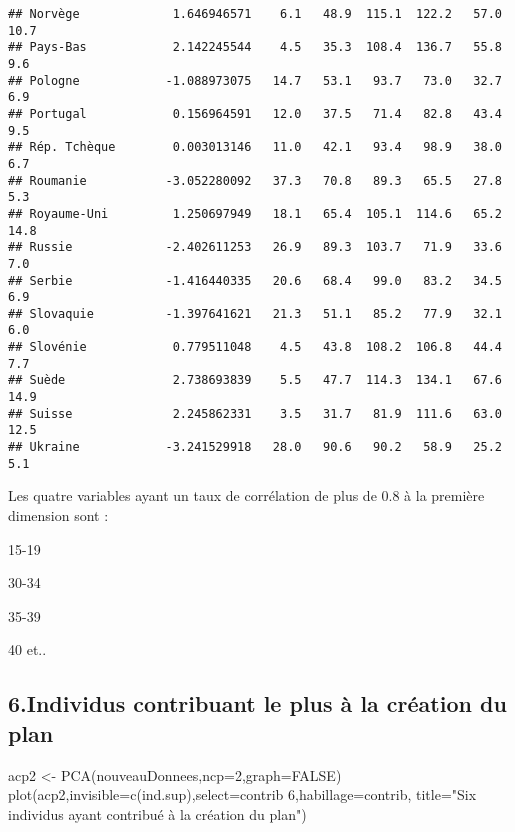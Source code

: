 \documentclass[
]{article}
\newenvironment{Shaded}{\begin{snugshade}}{\end{snugshade}}
\newcommand{\AttributeTok}[1]{\textcolor[rgb]{0.77,0.63,0.00}{#1}}
\newcommand{\ConstantTok}[1]{\textcolor[rgb]{0.00,0.00,0.00}{#1}}
\newcommand{\DecValTok}[1]{\textcolor[rgb]{0.00,0.00,0.81}{#1}}
\newcommand{\FunctionTok}[1]{\textcolor[rgb]{0.00,0.00,0.00}{#1}}
\newcommand{\NormalTok}[1]{#1}
\newcommand{\OtherTok}[1]{\textcolor[rgb]{0.56,0.35,0.01}{#1}}
\newcommand{\StringTok}[1]{\textcolor[rgb]{0.31,0.60,0.02}{#1}}
\begin{document}
\begin{verbatim}
## Norvège             1.646946571    6.1   48.9  115.1  122.2   57.0     10.7
## Pays-Bas            2.142245544    4.5   35.3  108.4  136.7   55.8      9.6
## Pologne            -1.088973075   14.7   53.1   93.7   73.0   32.7      6.9
## Portugal            0.156964591   12.0   37.5   71.4   82.8   43.4      9.5
## Rép. Tchèque        0.003013146   11.0   42.1   93.4   98.9   38.0      6.7
## Roumanie           -3.052280092   37.3   70.8   89.3   65.5   27.8      5.3
## Royaume-Uni         1.250697949   18.1   65.4  105.1  114.6   65.2     14.8
## Russie             -2.402611253   26.9   89.3  103.7   71.9   33.6      7.0
## Serbie             -1.416440335   20.6   68.4   99.0   83.2   34.5      6.9
## Slovaquie          -1.397641621   21.3   51.1   85.2   77.9   32.1      6.0
## Slovénie            0.779511048    4.5   43.8  108.2  106.8   44.4      7.7
## Suède               2.738693839    5.5   47.7  114.3  134.1   67.6     14.9
## Suisse              2.245862331    3.5   31.7   81.9  111.6   63.0     12.5
## Ukraine            -3.241529918   28.0   90.6   90.2   58.9   25.2      5.1
\end{verbatim}

Les quatre variables ayant un taux de corrélation de plus de 0.8 à la
première dimension sont :

15-19

30-34

35-39

40 et..

\hypertarget{individus-contribuant-le-plus-uxe0-la-cruxe9ation-du-plan}{%
\subsection{6.Individus contribuant le plus à la création du
plan}\label{individus-contribuant-le-plus-uxe0-la-cruxe9ation-du-plan}}

\begin{Shaded}
\begin{Highlighting}[]
\NormalTok{acp2 }\OtherTok{\textless{}{-}} \FunctionTok{PCA}\NormalTok{(nouveauDonnees,}\AttributeTok{ncp=}\DecValTok{2}\NormalTok{,}\AttributeTok{graph=}\ConstantTok{FALSE}\NormalTok{)}
\FunctionTok{plot}\NormalTok{(acp2,}\AttributeTok{invisible=}\FunctionTok{c}\NormalTok{(}\StringTok{\textquotesingle{}ind.sup\textquotesingle{}}\NormalTok{),}\AttributeTok{select=}\StringTok{\textquotesingle{}contrib  6\textquotesingle{}}\NormalTok{,}\AttributeTok{habillage=}\StringTok{\textquotesingle{}contrib\textquotesingle{}}\NormalTok{,}
     \AttributeTok{title=}\StringTok{"Six individus ayant contribué à la création du plan"}\NormalTok{)}
\end{Highlighting}
\end{Shaded}
\end{document}
